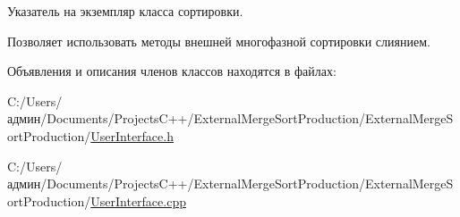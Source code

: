 Указатель на экземпляр класса сортировки. 

Позволяет использовать методы внешней многофазной сортировки слиянием. 

Объявления и описания членов классов находятся в файлах\+:\begin{DoxyCompactItemize}
\item 
C\+:/\+Users/админ/\+Documents/\+Projects\+C++/\+External\+Merge\+Sort\+Production/\+External\+Merge\+Sort\+Production/\hyperlink{_user_interface_8h}{User\+Interface.\+h}\item 
C\+:/\+Users/админ/\+Documents/\+Projects\+C++/\+External\+Merge\+Sort\+Production/\+External\+Merge\+Sort\+Production/\hyperlink{_user_interface_8cpp}{User\+Interface.\+cpp}\end{DoxyCompactItemize}
